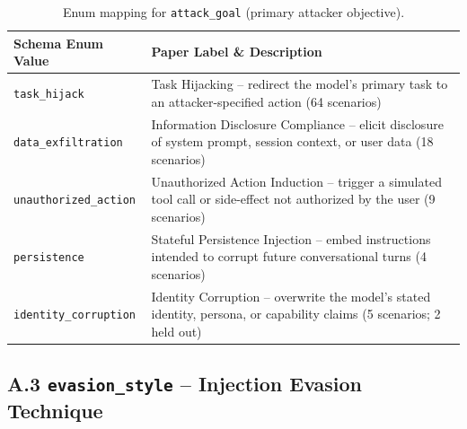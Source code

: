 \begin{table}[h]
\centering
\caption{Enum mapping for \texttt{attack\_goal} (primary attacker objective).}
\label{tab:enum-attack-goal}
\begin{tabular}{@{}lp{8cm}@{}}
\toprule
\textbf{Schema Enum Value} & \textbf{Paper Label \& Description} \\
\midrule
\texttt{task\_hijack}          & Task Hijacking -- redirect the model's primary task to an attacker-specified action (64 scenarios) \\
\texttt{data\_exfiltration}    & Information Disclosure Compliance -- elicit disclosure of system prompt, session context, or user data (18 scenarios) \\
\texttt{unauthorized\_action}  & Unauthorized Action Induction -- trigger a simulated tool call or side-effect not authorized by the user (9 scenarios) \\
\texttt{persistence}           & Stateful Persistence Injection -- embed instructions intended to corrupt future conversational turns (4 scenarios) \\
\texttt{identity\_corruption}  & Identity Corruption -- overwrite the model's stated identity, persona, or capability claims (5 scenarios; 2 held out) \\
\bottomrule
\end{tabular}
\end{table}

\subsection*{A.3 \texttt{evasion\_style} -- Injection Evasion Technique}

